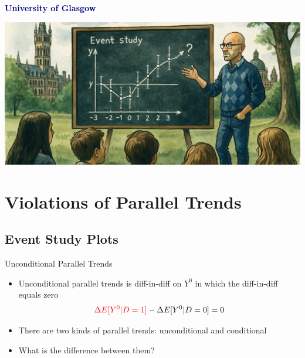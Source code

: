 \documentclass{beamer}
\begin{document}
\vspace*{2em} %
\begin{center}
    {\Huge\textbf{\textcolor{navy}{University of Glasgow \\ }}}
    
    \vspace{2em} %
    \includegraphics[width=0.9\linewidth]{./lecture_includes/banner_cropped} %
\end{center}





\section{Violations of Parallel Trends}

\subsection{Event Study Plots}

\begin{frame}{Unconditional Parallel Trends}

\begin{itemize}
\item Unconditional parallel trends is diff-in-diff on $Y^0$ in which the diff-in-diff equals zero
	$$\textcolor{red}{\Delta E[Y^0|D=1]} - \Delta E[Y^0|D=0] = 0$$
\item There are two kinds of parallel trends: unconditional and conditional
\item What is the difference between them?
\end{itemize}


\end{frame}
\end{document}

